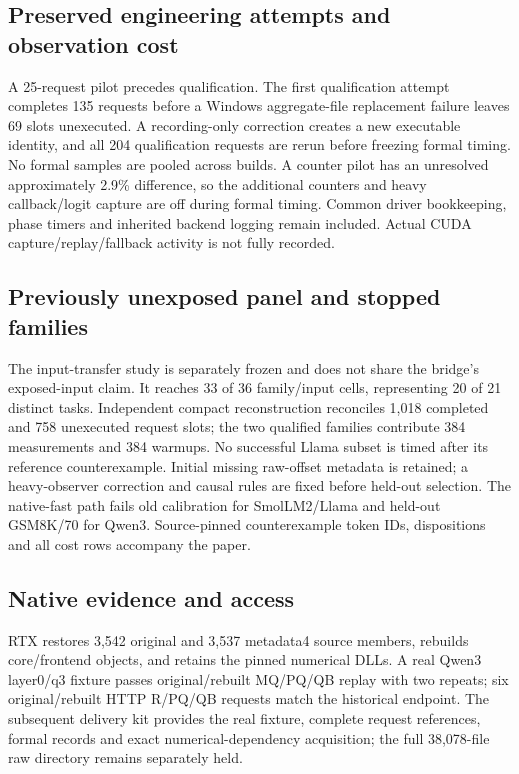 \subsection{Preserved engineering attempts and observation cost}
A 25-request pilot precedes qualification. The first qualification attempt completes 135 requests before a Windows aggregate-file replacement failure leaves 69 slots unexecuted. A recording-only correction creates a new executable identity, and all 204 qualification requests are rerun before freezing formal timing. No formal samples are pooled across builds. A counter pilot has an unresolved approximately 2.9\% difference, so the additional counters and heavy callback/logit capture are off during formal timing. Common driver bookkeeping, phase timers and inherited backend logging remain included. Actual CUDA capture/replay/fallback activity is not fully recorded.

\subsection{Previously unexposed panel and stopped families}
The input-transfer study is separately frozen and does not share the bridge's exposed-input claim. It reaches 33 of 36 family/input cells, representing 20 of 21 distinct tasks. Independent compact reconstruction reconciles 1,018 completed and 758 unexecuted request slots; the two qualified families contribute 384 measurements and 384 warmups. No successful Llama subset is timed after its reference counterexample. Initial missing raw-offset metadata is retained; a heavy-observer correction and causal rules are fixed before held-out selection. The native-fast path fails old calibration for SmolLM2/Llama and held-out GSM8K/70 for Qwen3. Source-pinned counterexample token IDs, dispositions and all cost rows accompany the paper.

\subsection{Native evidence and access}
RTX restores 3,542 original and 3,537 metadata4 source members, rebuilds core/frontend objects, and retains the pinned numerical DLLs. A real Qwen3 layer0/q3 fixture passes original/rebuilt MQ/PQ/QB replay with two repeats; six original/rebuilt HTTP R/PQ/QB requests match the historical endpoint. The subsequent delivery kit provides the real fixture, complete request references, formal records and exact numerical-dependency acquisition; the full 38,078-file raw directory remains separately held.

